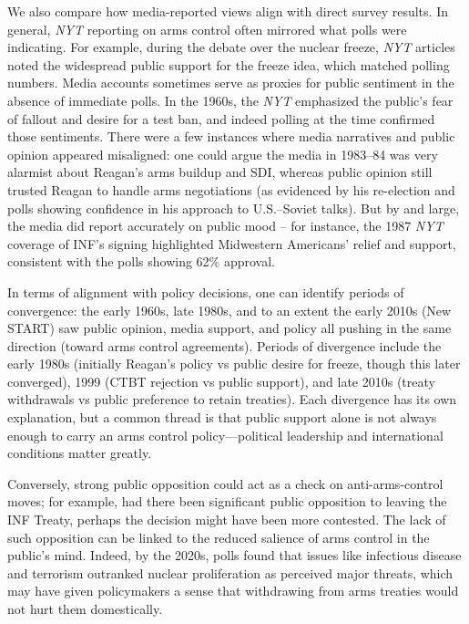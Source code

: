 \documentclass[11,5 pt]{article}
\begin{document}
    We also compare how media-reported views align with direct survey results. In general, \textit{NYT} reporting on arms control often mirrored what polls were indicating. For example, during the debate over the nuclear freeze, \textit{NYT} articles noted the widespread public support for the freeze idea, which matched polling numbers. Media accounts sometimes serve as proxies for public sentiment in the absence of immediate polls. In the 1960s, the \textit{NYT} emphasized the public’s fear of fallout and desire for a test ban, and indeed polling at the time confirmed those sentiments. There were a few instances where media narratives and public opinion appeared misaligned: one could argue the media in 1983–84 was very alarmist about Reagan’s arms buildup and SDI, whereas public opinion still trusted Reagan to handle arms negotiations (as evidenced by his re-election and polls showing confidence in his approach to U.S.–Soviet talks). But by and large, the media did report accurately on public mood – for instance, the 1987 \textit{NYT} coverage of INF’s signing highlighted Midwestern Americans’ relief and support, consistent with the polls showing 62\% approval. 
    
    In terms of alignment with policy decisions, one can identify periods of convergence: the early 1960s, late 1980s, and to an extent the early 2010s (New START) saw public opinion, media support, and policy all pushing in the same direction (toward arms control agreements). Periods of divergence include the early 1980s (initially Reagan’s policy vs public desire for freeze, though this later converged), 1999 (CTBT rejection vs public support), and late 2010s (treaty withdrawals vs public preference to retain treaties). Each divergence has its own explanation, but a common thread is that public support alone is not always enough to carry an arms control policy—political leadership and international conditions matter greatly. 
    
    Conversely, strong public opposition could act as a check on anti-arms-control moves; for example, had there been significant public opposition to leaving the INF Treaty, perhaps the decision might have been more contested. The lack of such opposition can be linked to the reduced salience of arms control in the public’s mind. Indeed, by the 2020s, polls found that issues like infectious disease and terrorism outranked nuclear proliferation as perceived major threats, which may have given policymakers a sense that withdrawing from arms treaties would not hurt them domestically. 
    
\end{document}
